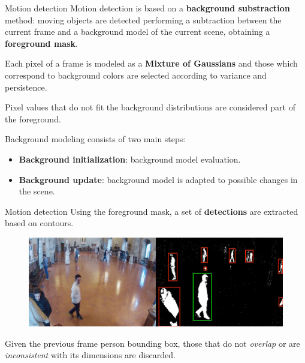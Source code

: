 \documentclass{beamer}
\begin{document}
\begin{tframe}{Motion detection}
Motion detection is based on a \textbf{background substraction} method: moving objects are detected performing a subtraction between the current frame and a background model of the current scene, obtaining a \textbf{foreground mask}.

\vspace{0.3cm}
Each pixel of a frame is modeled as a \textbf{Mixture of Gaussians} and those which correspond to background colors are selected according to variance and persistence.

Pixel values that do not fit the background distributions are considered part of the foreground.

\vspace{0.2cm}
Background modeling consists of two main steps:
\begin{itemize}
\item \textbf{Background initialization}: background model evaluation.
\item \textbf{Background update}: background model is adapted to possible changes in the scene.
\end{itemize}
\end{tframe}


\begin{tframe}{Motion detection}
Using the foreground mask, a set of \textbf{detections} are extracted based on contours.
\begin{figure}[h]
\centering
\includegraphics[width=1\textwidth]{images/frame_mog.jpg}
\end{figure}

Given the previous frame person bounding box, those that do not \emph{overlap} or are \emph{inconsistent} with its dimensions are discarded.
\end{tframe}
\end{document}
